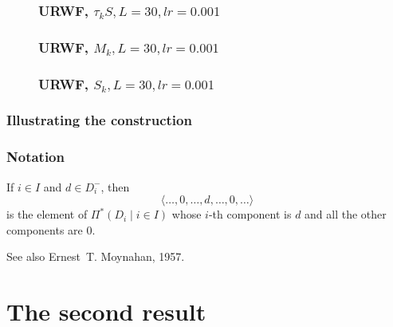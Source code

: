 \documentclass{beamer}
\theoremstyle{definition}
\theoremstyle{remark}
\begin{document}
\begin{frame}
  \begin{figure}
    \frametitle{URWF, $\tau_k{S},L=30,lr=0.001$}
    \centering
    \resizebox{0.9\textwidth}{!}{}
    \label{fig:rwf_s_05_l_30_lr_0.001}
  \end{figure}
\end{frame}
\begin{frame}
  \begin{figure}
    \frametitle{URWF, $M_k,L=30,lr=0.001$}
    \centering
    \resizebox{0.9\textwidth}{!}{}
    \label{fig:rwf_s_06_l_30_lr_0.001}
  \end{figure}
\end{frame}
\begin{frame}
  \begin{figure}
    \frametitle{URWF, $S_k,L=30,lr=0.001$}
    \centering
    \resizebox{0.9\textwidth}{!}{}
    \label{fig:rwf_s_07_l_30_lr_0.001}
  \end{figure}
\end{frame}





\begin{frame}
\frametitle{Illustrating the construction}
\end{frame}

\begin{frame}
\frametitle{Notation}

If $i \in I$ and $d \in D_{i}^{-}$, then
\[
  \langle \ldots, 0, \ldots, d, \ldots, 0, \ldots \rangle
\]
is the element of $\Pi^{*} ( D_{i} \mid i \in I )$ whose 
$i$-th component is $d$ and all the other components 
are $0$.

See also Ernest~T. Moynahan, 1957.
\end{frame}

\section[Second result]{The second result}
\end{document}
